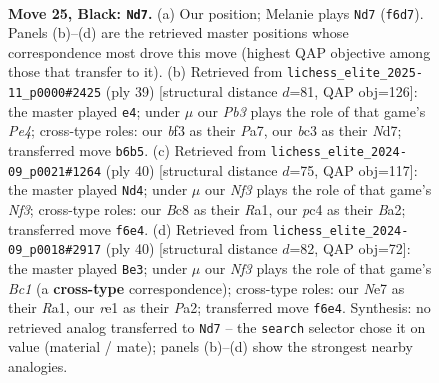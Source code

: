 \documentclass[11pt]{article}
\begin{document}
\clearpage

\begin{figure}[p]\centering
\begin{subfigure}{0.46\textwidth}\centering
\resizebox{\linewidth}{!}{%
\newchessgame
\chessboard[
  setfen={1rb2r2/p3np1k/1p2pnpp/2P5/1RP5/N1B1PB1P/P4PP1/4RK2 b - - 9 25},
  showmover=false,
  pgfstyle=straightmove, color=movearrow, markmove={f6-d7}
]}
\caption{}
\end{subfigure}\hfill
\begin{subfigure}{0.46\textwidth}\centering
\resizebox{\linewidth}{!}{%
\newchessgame
\chessboard[
  setfen={2k1rb1r/pppn2pp/5p2/2P1p3/PP1P4/5NBP/5PP1/R3R1K1 b - - 0 20},
  showmover=false,
  pgfstyle=straightmove, color=movearrow, markmove={e5-e4}
]}
\caption{}
\end{subfigure}
\\[4pt]
\begin{subfigure}{0.46\textwidth}\centering
\resizebox{\linewidth}{!}{%
\newchessgame
\chessboard[
  setfen={r2r2k1/nb3ppp/p3p3/1p6/2P5/P3PN2/BR3PPP/R5K1 w - - 1 21},
  showmover=false,
  pgfstyle=straightmove, color=movearrow, markmove={f3-d4}
]}
\caption{}
\end{subfigure}\hfill
\begin{subfigure}{0.46\textwidth}\centering
\resizebox{\linewidth}{!}{%
\newchessgame
\chessboard[
  setfen={r2r2k1/p4ppp/1np1p3/2b1P3/2PNb3/1B5P/P4PP1/R1BR2K1 w - - 2 21},
  showmover=false,
  pgfstyle=straightmove, color=movearrow, markmove={c1-e3}
]}
\caption{}
\end{subfigure}
\caption{\textbf{Move 25, Black: \texttt{Nd7}.} (a) Our position; Melanie plays \texttt{Nd7} (\texttt{f6d7}). Panels (b)--(d) are the retrieved master positions whose correspondence most drove this move (highest QAP objective among those that transfer to it). (b) Retrieved from \texttt{lichess\_elite\_2025-11\_p0000\#2425} (ply 39) [structural distance $d$=81, QAP obj=126]: the master played \texttt{e4}; under $\mu$ our \emph{Pb3} plays the role of that game's \emph{Pe4}; cross-type roles: our \emph{b}f3 as their \emph{P}a7, our \emph{b}c3 as their \emph{N}d7; transferred move \texttt{b6b5}. (c) Retrieved from \texttt{lichess\_elite\_2024-09\_p0021\#1264} (ply 40) [structural distance $d$=75, QAP obj=117]: the master played \texttt{Nd4}; under $\mu$ our \emph{Nf3} plays the role of that game's \emph{Nf3}; cross-type roles: our \emph{B}c8 as their \emph{R}a1, our \emph{p}c4 as their \emph{B}a2; transferred move \texttt{f6e4}. (d) Retrieved from \texttt{lichess\_elite\_2024-09\_p0018\#2917} (ply 40) [structural distance $d$=82, QAP obj=72]: the master played \texttt{Be3}; under $\mu$ our \emph{Nf3} plays the role of that game's \emph{Bc1} (a \textbf{cross-type} correspondence); cross-type roles: our \emph{N}e7 as their \emph{R}a1, our \emph{r}e1 as their \emph{P}a2; transferred move \texttt{f6e4}. Synthesis: no retrieved analog transferred to \texttt{Nd7} -- the \texttt{search} selector chose it on value (material / mate); panels (b)--(d) show the strongest nearby analogies.}
\label{fig:thought-m49}
\end{figure}
\end{document}
